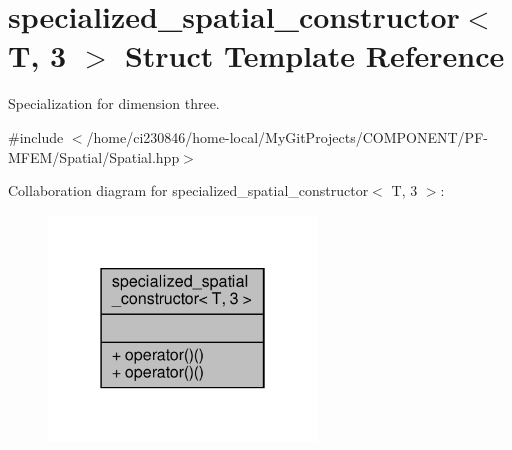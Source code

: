 \hypertarget{structspecialized__spatial__constructor_3_01T_00_013_01_4}{}\section{specialized\+\_\+spatial\+\_\+constructor$<$ T, 3 $>$ Struct Template Reference}
\label{structspecialized__spatial__constructor_3_01T_00_013_01_4}


Specialization for dimension three.  




{\ttfamily \#include $<$/home/ci230846/home-\/local/\+My\+Git\+Projects/\+C\+O\+M\+P\+O\+N\+E\+N\+T/\+P\+F-\/\+M\+F\+E\+M/\+Spatial/\+Spatial.\+hpp$>$}



Collaboration diagram for specialized\+\_\+spatial\+\_\+constructor$<$ T, 3 $>$\+:\nopagebreak
\begin{figure}[H]
\begin{center}
\leavevmode
\includegraphics[width=202pt]{structspecialized__spatial__constructor_3_01T_00_013_01_4__coll__graph}
\end{center}
\end{figure}
